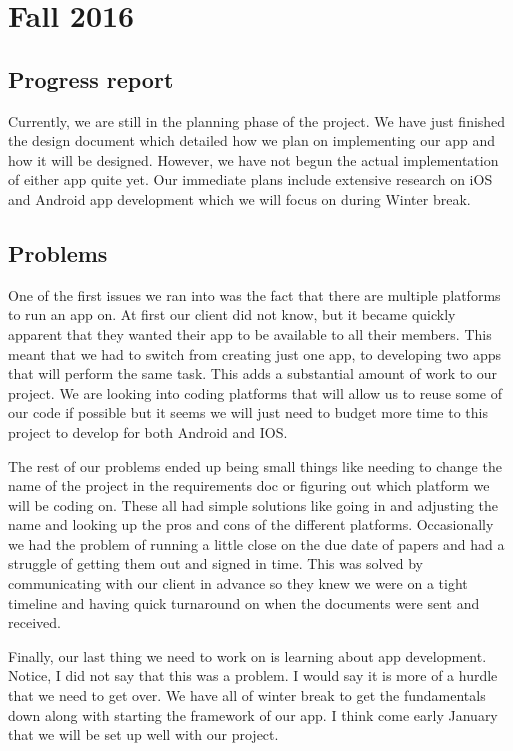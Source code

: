 \documentclass[letterpaper,10pt,draftclsnofoot,onecolumn,titlepage]{IEEEtran}
\begin{document}
\section{Fall 2016}
		\subsection{Progress report}
		Currently, we are still in the planning phase of the project. 
		We have just finished the design document which detailed how we plan on implementing our app and how it will be designed. 
		However, we have not begun the actual implementation of either app quite yet. 
		Our immediate plans include extensive research on iOS and Android app development which we will focus on during Winter break.
		
		\subsection{Problems}
		One of the first issues we ran into was the fact that there are multiple platforms to run an app on. 
		At first our client did not know, but it became quickly apparent that they wanted their app to be available to all their members. 
		This meant that we had to switch from creating just one app, to developing two apps that will perform the same task. This adds a substantial amount of work to our project. 
		We are looking into coding platforms that will allow us to reuse some of our code if possible but it seems we will just need to budget more time to this project to develop for both Android and IOS. 

	The rest of our problems ended up being small things like needing to change the name of the project in the requirements doc or figuring out which platform we will be coding on. 
	These all had simple solutions like going in and adjusting the name and looking up the pros and cons of the different platforms. 
	Occasionally we had the problem of running a little close on the due date of papers and had a struggle of getting them out and signed in time. 
	This was solved by communicating with our client in advance so they knew we were on a tight timeline and having quick turnaround on when the documents were sent and received. 

	Finally, our last thing we need to work on is learning about app development. 
	Notice, I did not say that this was a problem. 
	I would say it is more of a hurdle that we need to get over. 
	We have all of winter break to get the fundamentals down along with starting the framework of our app. 
	I think come early January that we will be set up well with our project. 
	
\end{document}
